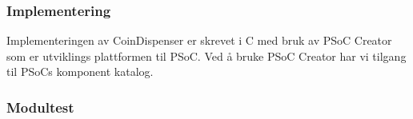 \documentclass[Rapport/BallDispenser/BallDispenser.tex]{subfiles}
\begin{document}
\subsubsection{Implementering}
Implementeringen av CoinDispenser er skrevet i C med bruk av PSoC Creator som er utviklings plattformen til PSoC. Ved å bruke PSoC Creator har vi tilgang til PSoCs komponent katalog.
\subsubsection{Modultest}
\end{document}
